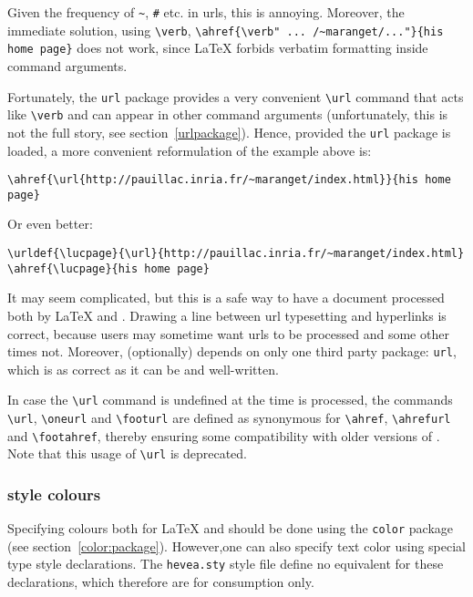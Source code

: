Given the frequency of \verb+~+, \verb+#+ etc. in urls,
this is annoying. Moreover, the immediate solution, using \verb+\verb+,
\verb+\ahref{\verb" ... /~maranget/..."}{his home page}+
does not work, since \LaTeX{} forbids verbatim formatting
inside command arguments.

Fortunately, the \texttt{url} package provides a very convenient
\verb+\url+ command that acts like \verb+\verb+ and can appear in
other command arguments
(unfortunately, this is not the full story, see section~\ref{urlpackage}).
Hence, provided the \texttt{url} package is loaded,
a more convenient reformulation of the example above is:
\begin{verbatim}
\ahref{\url{http://pauillac.inria.fr/~maranget/index.html}}{his home page}
\end{verbatim}
Or even better:
\begin{verbatim}
\urldef{\lucpage}{\url}{http://pauillac.inria.fr/~maranget/index.html}
\ahref{\lucpage}{his home page}
\end{verbatim}
It may seem complicated, but this is a safe way to have a
document processed both by \LaTeX{} and \hevea{}.
Drawing a line between url typesetting and hyperlinks is correct,
because users may sometime want urls to be processed and some other
times not.
Moreover, \hevea{} (optionally) depends on only one third party package:
\texttt{url}, which is as correct as it can be and well-written.



In case the \verb+\url+ command is undefined
at the time \verb++ is processed, the commands
\verb+\url+, \verb+\oneurl+ and \verb+\footurl+ are defined as
synonymous for
\verb+\ahref+, \verb+\ahrefurl+ and \verb+\footahref+, thereby
ensuring
some compatibility with older versions of \hevea.
Note that this usage of \verb+\url+ is deprecated.

\subsubsection{\html{} style colours}\label{color:high}
Specifying colours both for \LaTeX{} and
\hevea{} should be done using the \texttt{color} package (see
section~\ref{color:package}).
However,one can also specify text color using special type style declarations.
The \texttt{hevea.sty} style file
define no equivalent for these declarations, which therefore are for
\hevea{} consumption only.

